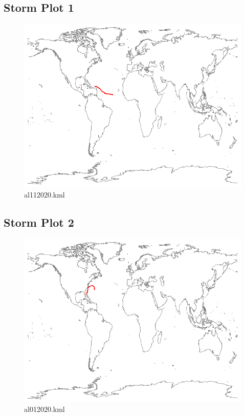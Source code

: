 \documentclass[]{article}
\begin{document}
\subsection{Storm Plot 1}
\begin{figure}[htbp]
    \centering
\includegraphics{al112020.png}
\caption{al112020.kml}
\label{fig:al112020}
\end{figure}

\clearpage
\subsection{Storm Plot 2}

\begin{figure}[htbp]
    \centering
\includegraphics{al012020.png}
\caption{al012020.kml}
\label{fig:al012020}
\end{figure}
\end{document}
